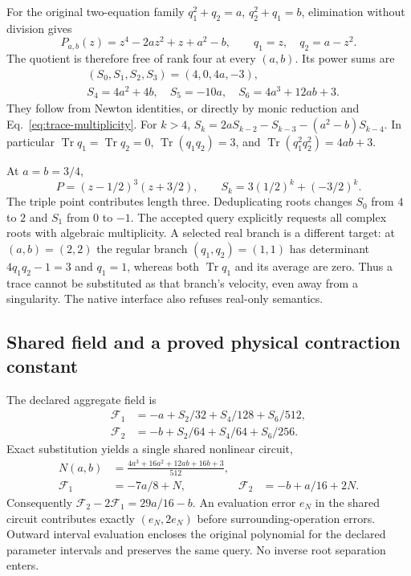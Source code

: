 For the original two-equation family
$q_1^2+q_2=a$, $q_2^2+q_1=b$, elimination without division gives
\begin{equation}
 P_{a,b}(z)=z^4-2az^2+z+a^2-b,
 \qquad q_1=z,\quad q_2=a-z^2.                            \label{eq:trace-quartic}
\end{equation}
The quotient is therefore free of rank four at every $(a,b)$.
Its power sums are
\begin{align}
 &(S_0,S_1,S_2,S_3)=(4,0,4a,-3),\\
 &S_4=4a^2+4b,\quad S_5=-10a,\quad S_6=4a^3+12ab+3.
\end{align}
They follow from Newton identities, or directly by monic reduction and
Eq.~\eqref{eq:trace-multiplicity}. For $k>4$,
$S_k=2aS_{k-2}-S_{k-3}-(a^2-b)S_{k-4}$.
In particular $\operatorname{Tr}q_1=\operatorname{Tr}q_2=0$,
$\operatorname{Tr}(q_1q_2)=3$, and
$\operatorname{Tr}(q_1^2q_2^2)=4ab+3$.

At $a=b=3/4$,
\begin{equation}
 P=(z-1/2)^3(z+3/2),\qquad
 S_k=3(1/2)^k+(-3/2)^k.                                  \label{eq:trace-triple}
\end{equation}
The triple point contributes length three. Deduplicating roots changes
$S_0$ from $4$ to $2$ and $S_1$ from $0$ to $-1$.
The accepted query explicitly requests all complex roots with algebraic
multiplicity. A selected real branch is a different target: at $(a,b)=(2,2)$
the regular branch $(q_1,q_2)=(1,1)$ has determinant $4q_1q_2-1=3$ and
$q_1=1$, whereas both $\operatorname{Tr}q_1$ and its average are zero.
Thus a trace cannot be substituted as that branch's velocity, even away
from a singularity. The native interface also refuses real-only semantics.

\subsection{Shared field and a proved physical contraction constant}

The declared aggregate field is
\begin{align}
 \mathcal F_1&=-a+S_2/32+S_4/128+S_6/512,\\
 \mathcal F_2&=-b+S_2/64+S_4/64+S_6/256.
\end{align}
Exact substitution yields a single shared nonlinear circuit,
\begin{align}
 N(a,b)&=\frac{4a^3+16a^2+12ab+16b+3}{512},\\
 \mathcal F_1&=-7a/8+N,&\mathcal F_2&=-b+a/16+2N.          \label{eq:trace-shared}
\end{align}
Consequently $\mathcal F_2-2\mathcal F_1=29a/16-b$.
An evaluation error $e_N$ in the shared circuit contributes exactly
$(e_N,2e_N)$ before surrounding-operation errors. Outward interval
evaluation encloses the original polynomial for the declared parameter
intervals and preserves the same query. No inverse root separation enters.

